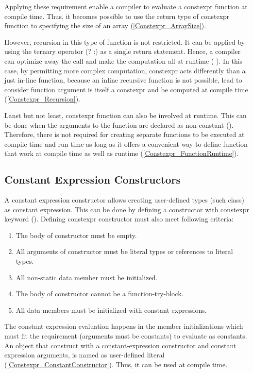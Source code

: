 \documentclass[11pt]{report}
\begin{document}
Applying these requirement enable a compiler to evaluate a constexpr function at compile time. Thus, it becomes possible to use the return type of constexpr function to specifying the size of an array (\ref{Constexpr_ArraySize}).

However, recursion in this type of function is not restricted. It can be applied by using the ternary operator (? :) as a single return statement. Hence, a compiler can optimize away the call and make the computation all at runtime ( \cite{Allain:2011:FutureCpp}). In this case, by permitting more complex computation, constexpr acts differently than a just in-line function, because an inline recursive function is not possible, lead to consider function argument is itself a constexpr and be computed at compile time (\ref{Constexpr_Recursion}).

Lanst but not least, constexpr function can also be involved at runtime. This can be done when the arguments to the function are declared as non-constant (\cite{Allain:2011:FutureCpp}). Therefore, there is not required for creating separate functions to be executed at compile time and run time as long as it offers a convenient way to define function that work at compile time as well as runtime (\ref{Constexpr_FunctionRuntime}).

\subsection{Constant Expression Constructors}
\label{subsection: Constant Expression Constructors}
A constant expression constructor allows creating user-defined types (such class) as constant expression. This can be done by defining a constructor with constexpr keyword (\cite{Gregorie:professionalcpp}). Defining constexpr constructor must also meet following criteria:

\begin{enumerate}
\item	The body of constructor must be empty.
\item	All arguments of constructor must be literal types or references to literal types.
\item   All non-static data member must be initialized.
\item	The body of constructor cannot be a function-try-block.
\item	All data members must be initialized with constant expressions.
\end{enumerate}

The constant expression evaluation happens in the member initializations which must fit the requirement (arguments must be constants) to evaluate as constants. An object that construct with a constant-expression constructor and constant expression arguments, is named as user-defined literal (\ref{Constexpr_ConstantConstructor}). Thus, it can be used at compile time.
\end{document}
